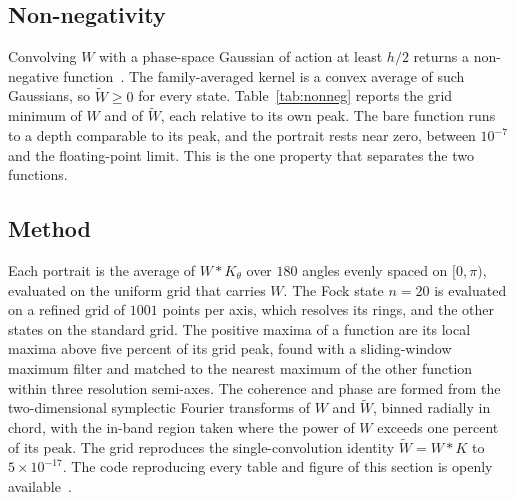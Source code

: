 \documentclass[%
  aps, amsmath, amssymb, onecolumn, 11pt
]{revtex4-2}
\begin{document}
\subsection{Non-negativity}
\label{sec:numerics_nonneg}

Convolving $W$ with a phase-space Gaussian of action at least $h/2$ returns a
non-negative function~\cite{cartwright1976, degosson2005bullsci}. The
family-averaged kernel is a convex average of such Gaussians, so
$\widetilde W \ge 0$ for every state. Table~\ref{tab:nonneg} reports the grid
minimum of $W$ and of $\widetilde W$, each relative to its own peak. The bare
function runs to a depth comparable to its peak, and the portrait rests near zero, between $10^{-7}$ and the floating-point limit. This is the one property
that separates the two functions.

\subsection{Method}
\label{sec:numerics_method}

Each portrait is the average of $W * K_\theta$ over $180$ angles evenly spaced
on $[0,\pi)$, evaluated on the uniform grid that carries $W$. The Fock state
$n=20$ is evaluated on a refined grid of $1001$ points per axis, which resolves
its rings, and the other states on the standard grid. The positive maxima of a
function are its local maxima above five percent of its grid peak, found with a
sliding-window maximum filter and matched to the nearest maximum of the other
function within three resolution semi-axes. The coherence and phase are formed from
the two-dimensional symplectic Fourier transforms of $W$ and $\widetilde W$,
binned radially in chord, with the in-band region taken where the power of $W$
exceeds one percent of its peak. The grid reproduces the single-convolution
identity $\widetilde W = W * K$ to $5\times10^{-17}$. The code reproducing
every table and figure of this section is openly available~\cite{zenododeposit}.
\end{document}
